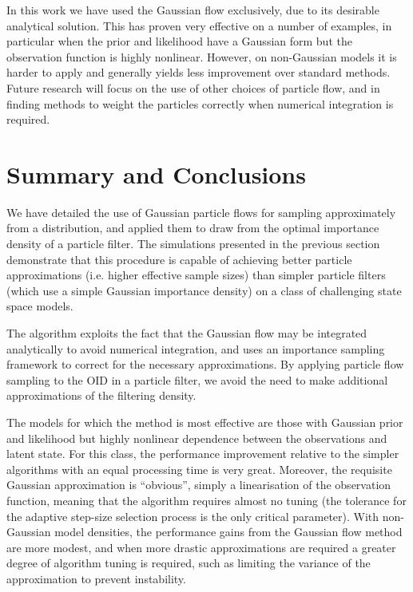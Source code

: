 \documentclass{article}
\begin{document}
In this work we have used the Gaussian flow exclusively, due to its desirable analytical solution. This has proven very effective on a number of examples, in particular when the prior and likelihood have a Gaussian form but the observation function is highly nonlinear. However, on non-Gaussian models it is harder to apply and generally yields less improvement over standard methods. Future research will focus on the use of other choices of particle flow, and in finding methods to weight the particles correctly when numerical integration is required.




\section{Summary and Conclusions}

We have detailed the use of Gaussian particle flows for sampling approximately from a distribution, and applied them to draw from the optimal importance density of a particle filter. The simulations presented in the previous section demonstrate that this procedure is capable of achieving better particle approximations (i.e. higher effective sample sizes) than simpler particle filters (which use a simple Gaussian importance density) on a class of challenging state space models.

The algorithm exploits the fact that the Gaussian flow may be integrated analytically to avoid numerical integration, and uses an importance sampling framework to correct for the necessary approximations. By applying particle flow sampling to the OID in a particle filter, we avoid the need to make additional approximations of the filtering density.

The models for which the method is most effective are those with Gaussian prior and likelihood but highly nonlinear dependence between the observations and latent state. For this class, the performance improvement relative to the simpler algorithms with an equal processing time is very great. Moreover, the requisite Gaussian approximation is ``obvious'', simply a linearisation of the observation function, meaning that the algorithm requires almost no tuning (the tolerance for the adaptive step-size selection process is the only critical parameter). With non-Gaussian model densities, the performance gains from the Gaussian flow method are more modest, and when more drastic approximations are required a greater degree of algorithm tuning is required, such as limiting the variance of the approximation to prevent instability.





%
\end{document}

